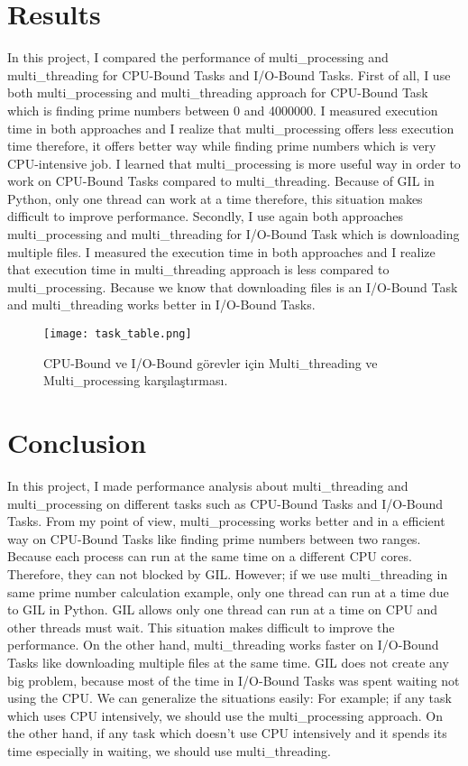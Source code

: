 \documentclass[onecolumn]{article}
\begin{document}
\section{Results}
In this project, I compared the performance of multi\_processing and multi\_threading for CPU-Bound Tasks and I/O-Bound Tasks. First of all, I use both multi\_processing and multi\_threading approach for CPU-Bound Task which is finding prime numbers between 0 and 4000000. I measured execution time in both approaches and I realize that multi\_processing offers less execution time therefore, it offers better way while finding prime numbers which is very CPU-intensive job. I learned that multi\_processing is more useful way in order to work on CPU-Bound Tasks compared to multi\_threading. Because of GIL in Python, only one thread can work at a time therefore, this situation makes difficult to improve performance. Secondly, I use again both approaches multi\_processing and multi\_threading for I/O-Bound Task which is downloading multiple files. I measured the execution time in both approaches and I realize that execution time in multi\_threading approach is less compared to multi\_processing. Because we know that downloading files is an I/O-Bound Task and multi\_threading works better in I/O-Bound Tasks.



\begin{figure}[ht] 
    \centering
    \texttt{[image: task\_table.png]} %
    \caption{CPU-Bound ve I/O-Bound görevler için Multi\_threading ve Multi\_processing karşılaştırması.}
    \label{fig:task_comparison}
\end{figure}





\section{Conclusion}
In this project, I made performance analysis about multi\_threading and multi\_processing on different tasks such as CPU-Bound Tasks and I/O-Bound Tasks. From my point of view, multi\_processing works better and in a efficient way on CPU-Bound Tasks like finding prime numbers between two ranges. Because each process can run at the same time on a different CPU cores. Therefore, they can not blocked by GIL. However; if we use multi\_threading in same prime number calculation example, only one thread can run at a time due to GIL in Python. GIL allows only one thread can run at a time on CPU and other threads must wait. This situation makes difficult to improve the performance. On the other hand, multi\_threading works faster on I/O-Bound Tasks like downloading multiple files at the same time. GIL does not create any big problem, because most of the time in I/O-Bound Tasks was spent waiting not using the CPU. We can generalize the situations easily: For example; if any task which uses CPU intensively, we should use the multi\_processing approach. On the other hand, if any task which doesn't use CPU intensively and it spends its time especially in waiting, we should use multi\_threading. 


\nocite{*}


\end{document}
